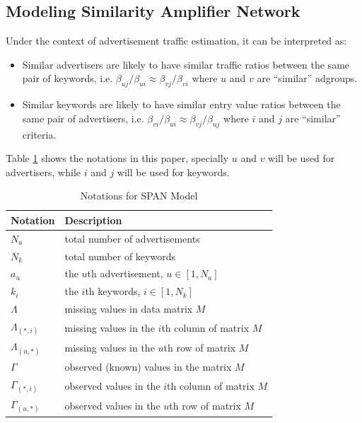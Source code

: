 \subsection{Modeling Similarity Amplifier Network} 
\label{sec:model_san}

Under the context of advertisement traffic estimation, it can be interpreted as:
\begin{itemize}
\item Similar advertisers are likely to have similar traffic ratios
  between the same pair of keywords, i.e. $\beta_{uj}/\beta_{ui}
  \approx \beta_{vj}/\beta_{vi}$ where $u$ and $v$ are ``similar''
  adgroups.
\item Similar keywords are likely to have similar entry value ratios
  between the same pair of advertisers, i.e. $\beta_{vi}/\beta_{ui}
  \approx \beta_{vj}/\beta_{uj}$ where $i$ and $j$ are ``similar''
  criteria.
\end{itemize}

Table \ref{tab:notations} shows the notations in this paper, specially
$u$ and $v$ will be used for advertisers, while $i$ and $j$ will be
used for keywords.

\begin{table}[!ht]
\centering
	\begin{tabular}{|l|l|}
	\hline
    Notation & Description \\ \hline
	$N_a$ & total number of advertisements \\ \hline
	$N_k$ & total number of keywords \\ \hline
	$a_u$ & the $u$th advertisement, $u\in [1,N_a]$\\ \hline
    $k_i$ & the $i$th keywords, $i\in [1,N_k]$\\ \hline
    $\Lambda$ & missing values in data matrix $M$\\ \hline
    $\Lambda_{(*,i)}$  & missing values in the $i$th column of matrix $M$\\ \hline
    $\Lambda_{(u,*)}$ & missing values in the $u$th row of matrix $M$\\ \hline
    $\Gamma$ & observed (known) values in the matrix $M$\\ \hline
    $\Gamma_{(*,i)}$ & observed values in the $i$th column of matrix $M$\\ \hline
    $\Gamma_{(u,*)}$& observed values in the $u$th row of matrix $M$\\     \hline
	\end{tabular}
	\caption{Notations for SPAN Model}
\label{tab:notations}
\end{table}

